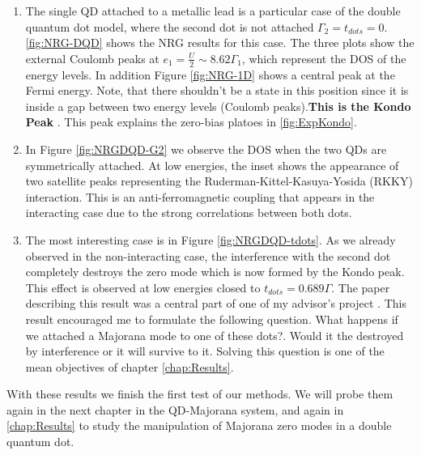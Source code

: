  \begin{enumerate}
 
\item The single QD attached to a metallic lead is a particular case of the double quantum dot model, where the second dot is not attached $\Gamma_2 = t_{dots}=0$.  \ref{fig:NRG-DQD} shows the NRG results for this case. The three plots show the external Coulomb peaks at $e_1 = \frac{U}{2} \sim 8.62\Gamma_1$, which represent the DOS of the energy levels. In addition  Figure \ref{fig:NRG-1D} shows a central peak at the Fermi energy. Note, that there shouldn't be a state in this position since it is inside a gap between two energy levels (Coulomb peaks).\textbf{This is the Kondo Peak} \cite{hewson_kondo_1997}. This peak explains the zero-bias platoes in \ref{fig:ExpKondo}.  
\item 
In Figure \ref{fig:NRGDQD-G2} we observe the DOS when the two QDs are symmetrically attached.  At low energies, the inset shows the appearance of two satellite peaks representing the Ruderman-Kittel-Kasuya-Yosida (RKKY) interaction. This is an anti-ferromagnetic coupling that appears in the interacting case due to the strong correlations between both dots. 

\item The most interesting case is in Figure \ref{fig:NRGDQD-tdots}. As we already observed in the non-interacting case, the interference with the second dot completely destroys the zero mode which is now formed by the Kondo peak. This effect is observed at low energies closed to $t_{dots}=0.689\Gamma$. The paper describing this result was a central part of one of my advisor's project \cite{dias_da_silva_transmission_2008}. This result encouraged me to formulate the following question. What happens if we attached a Majorana mode to one of these dots?. Would it the destroyed by interference or it will survive to it. Solving this question is one of the mean objectives of chapter \ref{chap:Results}. 
 \end{enumerate}

With these results we finish the first test of our methods. We will probe them again in the next chapter in the QD-Majorana system, and again in \ref{chap:Results} to study the manipulation of  Majorana zero modes in a double quantum dot. 








